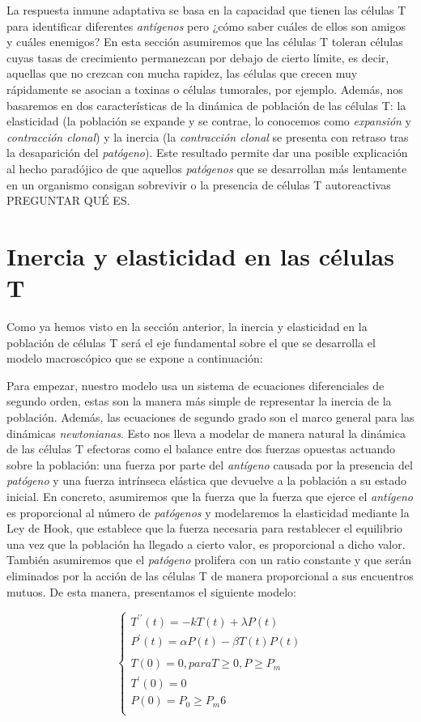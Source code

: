 La respuesta inmune adaptativa se basa en la capacidad que tienen las células T para identificar diferentes \textit{antígenos} pero ¿cómo saber cuáles de ellos son amigos y cuáles enemigos? En esta sección asumiremos que las células T toleran células cuyas tasas de crecimiento permanezcan por debajo de cierto límite, es decir, aquellas que no crezcan con mucha rapidez, las células que crecen muy rápidamente se asocian a toxinas o células tumorales, por ejemplo. Además, nos basaremos en dos características de la dinámica de población de las células T: la elasticidad (la población se expande y se contrae, lo conocemos como \textit{expansión} y \textit{contracción clonal}) y la inercia (la \textit{contracción clonal} se presenta con retraso tras la desaparición del \textit{patógeno}). Este resultado permite dar una posible explicación al hecho paradójico de que aquellos \textit{patógenos} que se desarrollan más lentamente en un organismo consigan sobrevivir o la presencia de células T autoreactivas PREGUNTAR QUÉ ES.


\section{Inercia y elasticidad en las células T}

Como ya hemos visto en la sección anterior, la inercia y elasticidad en la población de células T será el eje fundamental sobre el que se desarrolla el modelo macroscópico que se expone a continuación: 

Para empezar, nuestro modelo usa un sistema de ecuaciones diferenciales de segundo orden, estas son la manera más simple de representar la inercia de la población. Además, las ecuaciones de segundo grado son el marco general para las dinámicas \textit{newtonianas}. Esto nos lleva a modelar de manera natural la dinámica de las células T efectoras como el balance entre dos fuerzas opuestas actuando sobre la población: una fuerza por parte del \textit{antígeno} causada por la presencia del \textit{patógeno} y una fuerza intrínseca elástica que devuelve a la población a su estado inicial. En concreto, asumiremos que la fuerza que la fuerza que ejerce el \textit{antígeno} es proporcional al número de \textit{patógenos} y modelaremos la elasticidad mediante la Ley de Hook, que establece que la fuerza necesaria para restablecer el equilibrio una vez que la población ha llegado a cierto valor, es proporcional a dicho valor. También asumiremos que el \textit{patógeno} prolifera con un ratio constante y que serán eliminados por la acción de las células T de manera proporcional a sus encuentros mutuos. De esta manera, presentamos el siguiente modelo:

\begin{equation}
	\label{sist_macro}
	\left\{ \begin{array}{l}
	{T^{\prime\prime}}(t) = -kT(t) + \lambda P(t) \\
	{P^{\prime}}(t) = \alpha P(t) - \beta T(t)P(t) \\
	\\
	T(0)=0		,para T \geq 0, P \geq P_m \\
	T^{\prime}(0)=0  \\
	P(0)=P_0 \geq P_m 6 \\ 
	\end{array}
	\right.
\end{equation}

